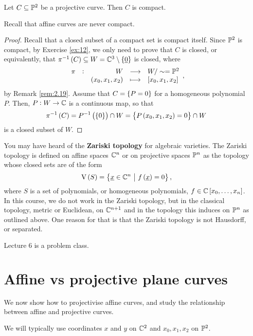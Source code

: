 \begin{lemma}
Let $ C \subseteq \mathbb{P}^2 $ be a projective curve. Then $ C $ is compact.
\end{lemma}

Recall that affine curves are never compact.

\begin{proof}
Recall that a closed subset of a compact set is compact itself. Since $ \mathbb{P}^2 $ is compact, by Exercise \ref{ex:12}, we only need to prove that $ C $ is closed, or equivalently, that $ \pi^{-1}\br{C} \subseteq W = \CC^3 \setminus \cbr{\underline{0}} $ is closed, where
$$ \function[\pi]{W}{W / \sim = \PP^2}{\br{x_0, x_1, x_2}}{\sbr{x_0, x_1, x_2}}, $$
by Remark \ref{rem:2.19}. Assume that $ C = \cbr{P = 0} $ for a homogeneous polynomial $ P $. Then, $ P : W \to \mathbb{C} $ is a continuous map, so that
$$ \pi^{-1}\br{C} = P^{-1}\br{\cbr{0}} \cap W = \cbr{P\br{x_0, x_1, x_2} = 0} \cap W $$
is a closed subset of $ W $.
\end{proof}

\begin{remark}
You may have heard of the \textbf{Zariski topology} for algebraic varieties. The Zariski topology is defined on affine spaces $ \mathbb{C}^n $ or on projective spaces $ \mathbb{P}^n $ as the topology whose closed sets are of the form
$$ \V\br{S} = \cbr{\underline{x} \in \CC^n \st f\br{\underline{x}} = 0}, $$
where $ S $ is a set of polynomials, or homogeneous polynomials, $ f \in \CC\sbr{x_0, \dots, x_n} $. In this course, we do not work in the Zariski topology, but in the classical topology, metric or Euclidean, on $ \mathbb{C}^{n + 1} $ and in the topology this induces on $ \mathbb{P}^n $ as outlined above. One reason for that is that the Zariski topology is not Hausdorff, or separated.
\end{remark}


Lecture 6 is a problem class.

\pagebreak

\section{Affine vs projective plane curves}

We now show how to projectivise affine curves, and study the relationship between affine and projective curves.

\begin{notation}
We will typically use coordinates $ x $ and $ y $ on $ \mathbb{C}^2 $ and $ x_0, x_1, x_2 $ on $ \mathbb{P}^2 $.
\end{notation}

